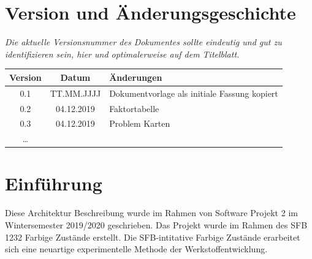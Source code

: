 \documentclass[enabledeprecatedfontcommands,fontsize=12pt,paper=a4,twoside]{scrartcl}
\begin{document}
\newpage

  \thispagestyle{fancy}
  \fancyhead{}
  \fancyfoot{}
  \renewcommand{\headrulewidth}{0.4pt}
  \tableofcontents

\newpage



\section*{Version und Änderungsgeschichte}

{\em Die aktuelle Versionsnummer des Dokumentes sollte eindeutig und gut zu
identifizieren sein, hier und optimalerweise auf dem Titelblatt.}

\begin{tabular}{ccl}
Version & Datum & Änderungen \\
\hline
0.1 & TT.MM.JJJJ & Dokumentvorlage als initiale Fassung kopiert \\
0.2 & 04.12.2019 & Faktortabelle \\
0.3 & 04.12.2019 & Problem Karten \\
\ldots
\end{tabular}


\section{Einführung}

Diese Architektur Beschreibung wurde im Rahmen von Software Projekt 2 im Wintersemester 2019/2020 geschrieben. Das Projekt wurde im Rahmen des SFB 1232 Farbige Zustände erstellt. Die SFB-intitative \glqq Farbige Zustände\grqq{} erarbeitet sich eine neuartige experimentelle Methode der Werkstoffentwicklung.
\end{document}
